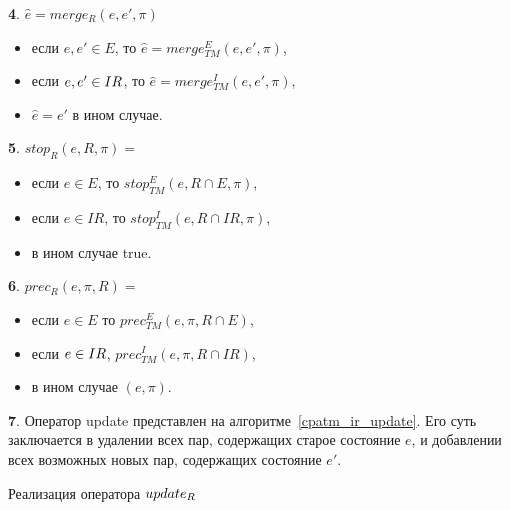 {\textbf 4.}
$\hat e = merge_{R}(e,e', \pi)$
\begin{itemize}
\item если $e,e' \in E$, то $\hat e = merge^E_{TM}(e, e', \pi)$,
\item если $e,e' \in IR$, то $\hat e = merge^I_{TM}(e, e', \pi)$,
\item $\hat e = e'$ в ином случае.
\end{itemize}

{\textbf 5.}
$stop_{R}(e,R, \pi)=$
\begin{itemize}
\item если $e \in E$, то $stop^E_{TM}(e, R\cap E, \pi)$,
\item если $e \in IR$, то $stop^I_{TM}(e, R\cap IR, \pi)$,
\item в ином случае true.
\end{itemize}

{\textbf 6.}
$prec_{R}(e,\pi, R)=$
\begin{itemize}
\item если $e \in E$ то $prec^E_{TM}(e, \pi, R\cap E)$,
\item если $e \in IR$, $prec^I_{TM}(e, \pi, R\cap IR)$,
\item в ином случае $(e, \pi)$.
\end{itemize}

{\textbf 7.} %
Оператор update представлен на алгоритме~\ref{cpatm_ir_update}.
Его суть заключается в удалении всех пар, содержащих старое состояние $e$, и добавлении всех возможных новых пар, содержащих состояние $e'$.
\begin{algorithm}
 \caption{Реализация оператора $update_R$}
 \label{cpatm_ir_update}
\end{algorithm}


